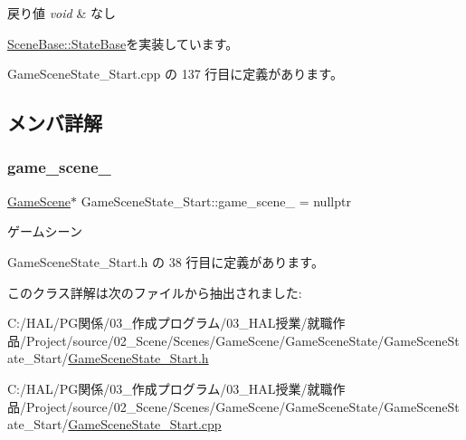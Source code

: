 \begin{DoxyRetVals}{戻り値}
{\em void} & なし \\
\hline
\end{DoxyRetVals}


\mbox{\hyperlink{class_scene_base_1_1_state_base_ad2c6c8fd9f020eb02f64f394edee129c}{Scene\+Base\+::\+State\+Base}}を実装しています。



 Game\+Scene\+State\+\_\+\+Start.\+cpp の 137 行目に定義があります。



\subsection{メンバ詳解}
\mbox{\label{class_game_scene_state___start_af9389c7c8496419a6a4a3d3339acd94f}} 
\subsubsection{\texorpdfstring{game\+\_\+scene\+\_\+}{game\_scene\_}}
{\footnotesize\ttfamily \mbox{\hyperlink{class_game_scene}{Game\+Scene}}$\ast$ Game\+Scene\+State\+\_\+\+Start\+::game\+\_\+scene\+\_\+ = nullptr\hspace{0.3cm}{\ttfamily [protected]}}



ゲームシーン 



 Game\+Scene\+State\+\_\+\+Start.\+h の 38 行目に定義があります。



このクラス詳解は次のファイルから抽出されました\+:\begin{DoxyCompactItemize}
\item 
C\+:/\+H\+A\+L/\+P\+G関係/03\+\_\+作成プログラム/03\+\_\+\+H\+A\+L授業/就職作品/\+Project/source/02\+\_\+\+Scene/\+Scenes/\+Game\+Scene/\+Game\+Scene\+State/\+Game\+Scene\+State\+\_\+\+Start/\mbox{\hyperlink{_game_scene_state___start_8h}{Game\+Scene\+State\+\_\+\+Start.\+h}}\item 
C\+:/\+H\+A\+L/\+P\+G関係/03\+\_\+作成プログラム/03\+\_\+\+H\+A\+L授業/就職作品/\+Project/source/02\+\_\+\+Scene/\+Scenes/\+Game\+Scene/\+Game\+Scene\+State/\+Game\+Scene\+State\+\_\+\+Start/\mbox{\hyperlink{_game_scene_state___start_8cpp}{Game\+Scene\+State\+\_\+\+Start.\+cpp}}\end{DoxyCompactItemize}

